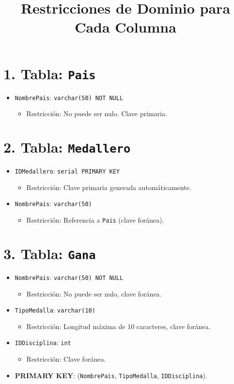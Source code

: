 \title{Restricciones de Dominio para Cada Columna}

\maketitle

\section*{1. Tabla: \texttt{Pais}}
\begin{itemize}
    \item \texttt{NombrePais}: \texttt{varchar(50) NOT NULL} 
    \begin{itemize}
        \item Restricción: No puede ser nulo. Clave primaria.
    \end{itemize}
\end{itemize}

\section*{2. Tabla: \texttt{Medallero}}
\begin{itemize}
    \item \texttt{IDMedallero}: \texttt{serial PRIMARY KEY} 
    \begin{itemize}
        \item Restricción: Clave primaria generada automáticamente.
    \end{itemize}
    \item \texttt{NombrePais}: \texttt{varchar(50)} 
    \begin{itemize}
        \item Restricción: Referencia a \texttt{Pais} (clave foránea).
    \end{itemize}
\end{itemize}

\section*{3. Tabla: \texttt{Gana}}
\begin{itemize}
    \item \texttt{NombrePais}: \texttt{varchar(50) NOT NULL}
    \begin{itemize}
        \item Restricción: No puede ser nulo, clave foránea.
    \end{itemize}
    \item \texttt{TipoMedalla}: \texttt{varchar(10)}
    \begin{itemize}
        \item Restricción: Longitud máxima de 10 caracteres, clave foránea.
    \end{itemize}
    \item \texttt{IDDisciplina}: \texttt{int}
    \begin{itemize}
        \item Restricción: Clave foránea.
    \end{itemize}
    \item \textbf{PRIMARY KEY}: (\texttt{NombrePais}, \texttt{TipoMedalla}, \texttt{IDDisciplina}).
\end{itemize}

